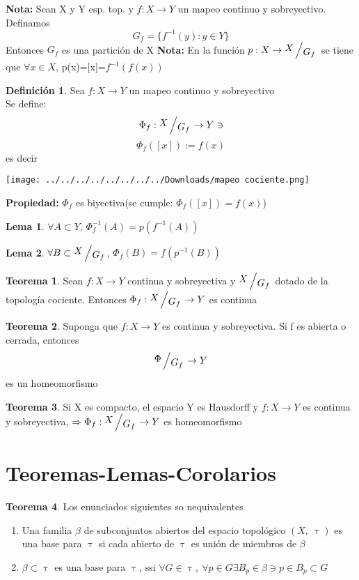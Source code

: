 \documentclass{article}
\theoremstyle{definition}
\newtheorem{definition}{Definición}[section]
\newtheorem{theorem}{Teorema}[section]
\newtheorem{lemma}{Lema}[section]
\newcommand{\bigslant}[2]{{\raisebox{.2em}{$#1$}\left/\raisebox{-.2em}{$#2$}\right.}}
\begin{document}
\textbf{Nota: }
Sean X y Y esp. top. y $f:X\to Y$ un mapeo continuo y sobreyectivo. Definamos
\[G_f=\{f^{-1}(y):y\in Y\}\]
Entonces $G_f$ es una partición de X 
\textbf{Nota: } En la función $p:X\to\bigslant{X}{G_f}$ se tiene que $\forall x\in X$, p(x)=[x]=$f^{-1}(f(x))$
\begin{definition}
	Sea $f:X\to Y$ un mapeo continuo y sobreyectivo\\
	Se define: 
	\[\Phi_f:\bigslant{X}{G_f}\to Y\ni\]
	\[\Phi_f([x]):=f(x)\]
	es decir\\
	\begin{center}
\texttt{[image: ../../../../../../../../Downloads/mapeo cociente.png]}
	\end{center}	
\textbf{Propiedad: } $\Phi_f$ es biyectiva(se cumple: $\Phi_f([x])=f(x)$)
\end{definition}
\begin{lemma}
	$\forall A\subset Y$, $\Phi^{-1}_f(A)=p(f^{-1}(A))$
\end{lemma}
\begin{lemma}
	$\forall B\subset\bigslant{X}{G_f}$, $\Phi_f(B)=f(p^{-1}(B))$
\end{lemma}
\begin{theorem}
	Sean $f:X\to Y$ continua y sobreyectiva y  $\bigslant{X}{G_f}$ dotado de la topología cociente. Entonces $\Phi_f:\bigslant{X}{G_f}\to Y$ es continua
\end{theorem}
\begin{theorem}
	Suponga que $f:X\to Y$ es continua y sobreyectiva. Si f es abierta o cerrada, entonces 
	\[ \bigslant{\Phi}{G_f}\to Y\]
	es un homeomorfismo
\end{theorem}
\begin{theorem}
	Si X es compacto, el espacio Y es Hausdorff y $f:X\to Y$ es continua y sobreyectiva, $\Rightarrow \Phi_f:\bigslant{X}{G_f}\to Y$ es homeomorfismo
\end{theorem}

















\newpage
\section{Teoremas-Lemas-Corolarios}
\begin{theorem}
	Los enunciados siguientes so nequivalentes
	\begin{enumerate}
		\item Una familia $\beta$ de subconjuntos abiertos del espacio topológico $(X,\ \uptau)$ es una base para $\uptau$ si cada abierto de $\uptau$ es unión de miembros de $\beta$
		\item $\beta\subset\uptau$ es una base para $\uptau$, ssi $\forall G\in \uptau,\ \forall p\in G \exists B_p\in\beta\ni p\in B_p\subset G$ 
	\end{enumerate}
\end{theorem}
\end{document}
